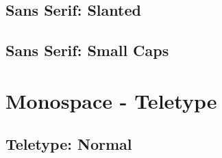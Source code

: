 \subsection{Sans Serif: Slanted}
\begin{sffamily}
    \begin{slshape}
        \blindtext
    \end{slshape}
\end{sffamily}

\subsection{Sans Serif: Small Caps}
\begin{sffamily}
    \begin{scshape}
        \blindtext
    \end{scshape}
\end{sffamily}

%

\section{Monospace - Teletype}
\subsection{Teletype: Normal}
\begin{ttfamily}
    \blindtext
\end{ttfamily}

